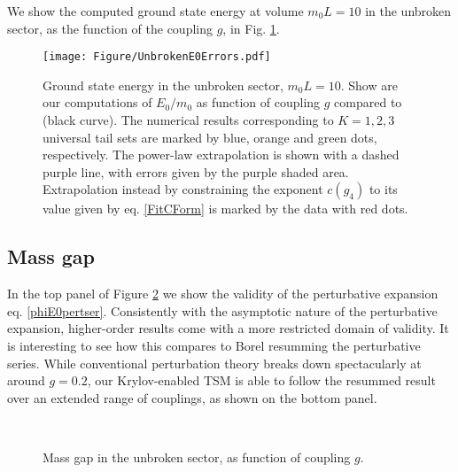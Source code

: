 \documentclass[twocolumn,secnumarabic,amssymb, nobibnotes, aps, prd]{revtex4-2}
\begin{document}
We show the computed ground state energy at volume $m_0L=10$ in the unbroken sector, as the function of the coupling $g$, in Fig. \ref{FigE0Unbroken}.
\begin{figure}[h]
    \centering

\texttt{[image: Figure/UnbrokenE0Errors.pdf]}\\%

\caption{Ground state energy in the unbroken sector, $m_0L=10$. 
Show are our computations of $E_0/m_0$ as function of coupling $g$ compared to \cite{Elias-Miro:2017tup} (black curve). The numerical results corresponding to $K=1,2,3$ universal tail sets are marked by blue, orange and green dots, respectively. The power-law extrapolation is shown with a dashed purple line, with errors given by the purple shaded area. Extrapolation instead by constraining the exponent $c(g_4)$ to its value given by eq. \eqref{FitCForm} is marked by the data with red dots.}
    \label{FigE0Unbroken}
\end{figure}

\subsection{Mass gap}
In the top panel of Figure \ref{FigMassdep} we show the validity of the perturbative expansion eq. \eqref{phiE0pertser}. Consistently with the asymptotic nature of the perturbative expansion, higher-order results come with a more restricted domain of validity.  It is interesting to see how this compares to Borel resumming the perturbative series. While conventional perturbation theory breaks down spectacularly at around $g=0.2$, our Krylov-enabled TSM is able to follow the resummed result over an extended range of couplings, as shown on the bottom panel.
\begin{figure}[h]
     \\

    \caption{Mass gap in the unbroken sector, as function of coupling $g$. }
    \label{FigMassdep}
\end{figure}
\end{document}

